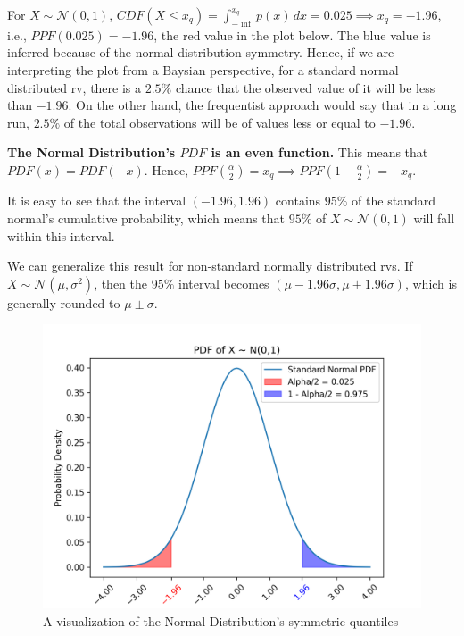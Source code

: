 \documentclass{article}
\begin{document}
For $X \sim \mathcal{N}(0, 1)$, $CDF(X \leq x_q) = \int_{-\inf}^{x_q} p(x) \, dx = 0.025 \implies x_q = -1.96 $, i.e., $PPF(0.025) = -1.96$, the red value in the plot below. The blue value is inferred because of the normal distribution symmetry. Hence, if we are interpreting the plot from a Baysian perspective, for a standard normal distributed rv, there is a $2.5\%$ chance that the observed value of it will be less than $-1.96$. On the other hand, the frequentist approach would say that in a long run, $2.5\%$ of the total observations will be of values less or equal to $-1.96$.

\textbf{The Normal Distribution's $PDF$ is an even function.} This means that $PDF(x) = PDF(-x)$. Hence, $PPF(\frac{\alpha}{2})  = x_q \implies PPF(1 - \frac{\alpha}{2}) = -x_q$.

It is easy to  see that the interval $(-1.96, 1.96)$ contains $95\%$ of the standard normal's cumulative probability, which means that $95\%$ of $X \sim \mathcal{N}(0, 1)$ will fall within this interval.

We can generalize this result for non-standard normally distributed rvs. If  $X \sim \mathcal{N}(\mu, \sigma^2)$, then the $95\%$ interval becomes $(\mu - 1.96\sigma, \mu + 1.96\sigma)$, which is generally rounded to $\mu \pm\sigma$.

\begin{figure}[h] 
	\centering
	\includegraphics[width=\linewidth]{images/standard_normal_pdf.png}
	\caption{A visualization of the Normal Distribution's symmetric quantiles}
	\label{fig:standard_normal_pdf}
\end{figure}
\end{document}
